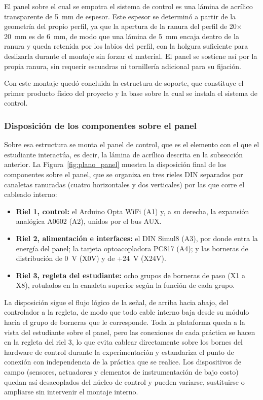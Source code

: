 \documentclass[12pt,a4paper,oneside]{report}
\begin{document}
El panel sobre el cual se empotra el sistema de control es una lámina de acrílico transparente de 5~mm de espesor. Este espesor se determinó a partir de la geometría del propio perfil, ya que la apertura de la ranura del perfil de 20$\times$20~mm es de 6~mm, de modo que una lámina de 5~mm encaja dentro de la ranura y queda retenida por los labios del perfil, con la holgura suficiente para deslizarla durante el montaje sin forzar el material. El panel se sostiene así por la propia ranura, sin requerir escuadras ni tornillería adicional para su fijación.

Con este montaje quedó concluida la estructura de soporte, que constituye el primer producto físico del proyecto y la base sobre la cual se instala el sistema de control.

\subsubsection{Disposición de los componentes sobre el panel}

Sobre esa estructura se monta el panel de control, que es el elemento con el que el estudiante interactúa, es decir, la lámina de acrílico descrita en la subsección anterior. La Figura~\ref{fig:plano_panel} muestra la disposición final de los componentes sobre el panel, que se organiza en tres rieles DIN separados por canaletas ranuradas (cuatro horizontales y dos verticales) por las que corre el cableado interno:

\begin{itemize}
    \item \textbf{Riel 1, control:} el Arduino Opta WiFi (A1) y, a su derecha, la expansión analógica A0602 (A2), unidos por el bus AUX.
    \item \textbf{Riel 2, alimentación e interfaces:} el DIN Simul8 (A3), por donde entra la energía del panel; la tarjeta optoacopladora PC817 (A4); y las borneras de distribución de 0~V (X0V) y de +24~V (X24V).
    \item \textbf{Riel 3, regleta del estudiante:} ocho grupos de borneras de paso (X1 a X8), rotulados en la canaleta superior según la función de cada grupo.
\end{itemize}

La disposición sigue el flujo lógico de la señal, de arriba hacia abajo, del controlador a la regleta, de modo que todo cable interno baja desde su módulo hacia el grupo de borneras que le corresponde. Toda la plataforma queda a la vista del estudiante sobre el panel, pero las conexiones de cada práctica se hacen en la regleta del riel 3, lo que evita cablear directamente sobre los bornes del hardware de control durante la experimentación y estandariza el punto de conexión con independencia de la práctica que se realice. Los dispositivos de campo (sensores, actuadores y elementos de instrumentación de bajo costo) quedan así desacoplados del núcleo de control y pueden variarse, sustituirse o ampliarse sin intervenir el montaje interno.
\end{document}
